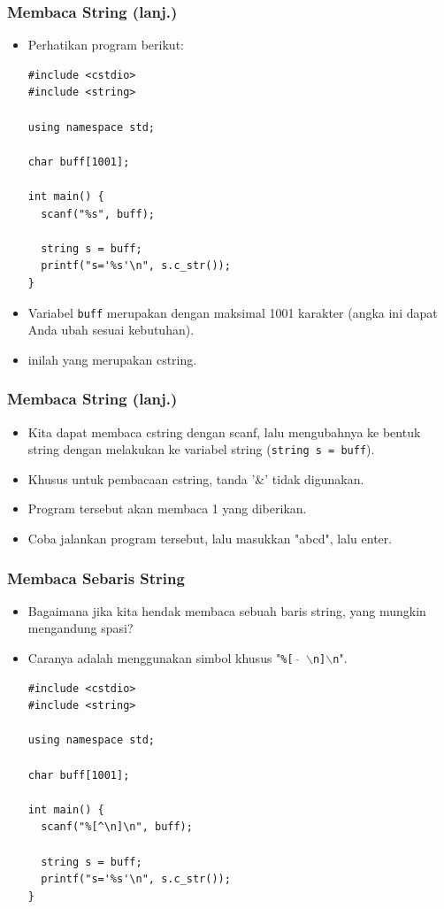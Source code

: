 \begin{frame}[fragile]
\frametitle{Membaca String (lanj.)}
\begin{itemize}
  \item Perhatikan program berikut:
\begin{lstlisting}
#include <cstdio>
#include <string>

using namespace std;

char buff[1001];

int main() {
  scanf("%s", buff);

  string s = buff;
  printf("s='%s'\n", s.c_str());
}
\end{lstlisting}
  \item Variabel \texttt{buff} merupakan  dengan maksimal 1001 karakter (angka ini dapat Anda ubah sesuai kebutuhan).
  \item {} inilah yang merupakan cstring.
\end{itemize}
\end{frame}

\begin{frame}[fragile]
\frametitle{Membaca String (lanj.)}
\begin{itemize}
  \item Kita dapat membaca cstring dengan scanf, lalu mengubahnya ke bentuk string dengan melakukan  ke variabel string (\texttt{string s = buff}).
  \item Khusus untuk pembacaan cstring, tanda '\&' tidak digunakan.
  \item Program tersebut akan membaca 1  yang diberikan.
  \item Coba jalankan program tersebut, lalu masukkan "abcd", lalu enter.
\end{itemize}
\end{frame}


\begin{frame}[fragile]
\frametitle{Membaca Sebaris String}
\begin{itemize}
  \item Bagaimana jika kita hendak membaca sebuah baris string, yang mungkin mengandung spasi?
  \item Caranya adalah menggunakan simbol khusus "\texttt{\%[ $\widehat{}$ $\backslash$n]$\backslash$n}".
\begin{lstlisting}
#include <cstdio>
#include <string>

using namespace std;

char buff[1001];

int main() {
  scanf("%[^\n]\n", buff);

  string s = buff;
  printf("s='%s'\n", s.c_str());
}
\end{lstlisting}
\end{itemize}
\end{frame}

